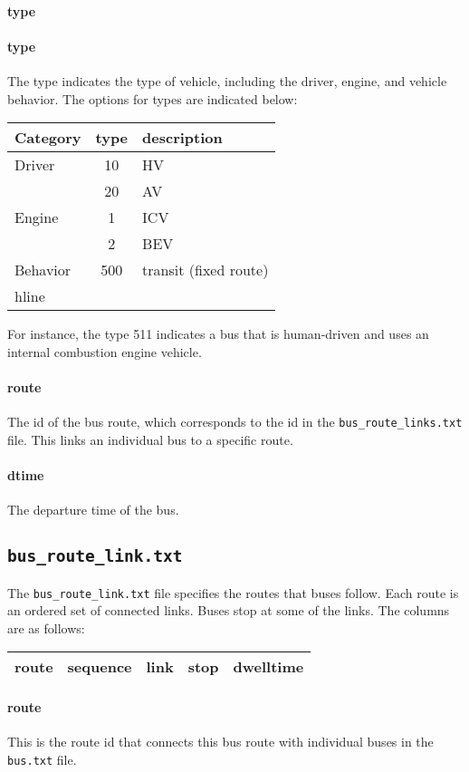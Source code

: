\paragraph*{type} \paragraph*{type} The type indicates the type of vehicle, including the driver, engine, and vehicle behavior. The options for types are indicated below:
\begin{center}
	\begin{tabular}{lcl}
		\hline
		Category & type & description \\\hline
		Driver & 10 & HV \\
		& 20 & AV\\\hline
		Engine & 1 & ICV \\
		& 2 & BEV\\\hline
		Behavior & 500 & transit (fixed route)\\hline
	\end{tabular}
\end{center}
For instance, the type 511 indicates a bus that is human-driven and uses an internal combustion engine vehicle.

\paragraph*{route} The id of the bus route, which corresponds to the id in the \texttt{bus\_route\_links.txt} file. This links an individual bus to a specific route.
\paragraph*{dtime} The departure time of the bus.


\subsection{\texttt{bus\_route\_link.txt}}
The \texttt{bus\_route\_link.txt} file specifies the routes that buses follow. Each route is an ordered set of connected links. Buses stop at some of the links. The columns are as follows:
\begin{center}
\begin{tabular}{ccccc}
\hline
route & sequence & link & stop & dwelltime\\\hline	
\end{tabular}
\end{center}
\paragraph*{route} This is the route id that connects this bus route with individual buses in the \texttt{bus.txt} file.
